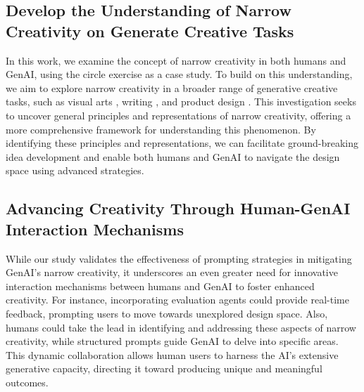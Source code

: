 \subsection{Develop the Understanding of Narrow Creativity on Generate Creative Tasks}
In this work, we examine the concept of narrow creativity in both humans and GenAI, using the circle exercise as a case study. 
To build on this understanding, we aim to explore narrow creativity in a broader range of generative creative tasks, such as visual arts \cite{choi2024creativeconnect}, writing \cite{lee2024design}, and product design \cite{kwon2024designer}. 
This investigation seeks to uncover general principles and representations of narrow creativity, offering a more comprehensive framework for understanding this phenomenon.
By identifying these principles and representations, we can facilitate ground-breaking idea development and enable both humans and GenAI to navigate the design space using advanced strategies. 



\subsection{Advancing Creativity Through Human-GenAI Interaction Mechanisms}

While our study validates the effectiveness of prompting strategies in mitigating GenAI's narrow creativity, it underscores an even greater need for innovative interaction mechanisms between humans and GenAI to foster enhanced creativity.
For instance, incorporating evaluation agents could provide real-time feedback, prompting users to move towards unexplored design space. 
Also, humans could take the lead in identifying and addressing these aspects of narrow creativity, while structured prompts guide GenAI to delve into specific areas. 
This dynamic collaboration allows human users to harness the AI’s extensive generative capacity, directing it toward producing unique and meaningful outcomes. 
